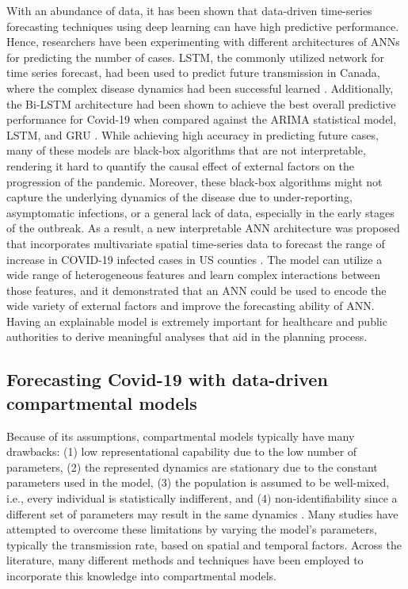 With an abundance of data, it has been shown that data-driven time-series forecasting techniques using deep learning can have high predictive performance.
Hence, researchers have been experimenting with different architectures of \glspl{ANN} for predicting the number of cases.
\gls{LSTM}, the commonly utilized network for time series forecast, had been used to predict future transmission in Canada, where the complex disease dynamics had been successful learned \cite{chimmulaTimeSeriesForecasting2020}.
Additionally, the \gls{Bi-LSTM} architecture had been shown to achieve the best overall predictive performance for Covid-19 when compared against the \gls{ARIMA} statistical model, \gls{LSTM}, and \gls{GRU} \cite{shahidPredictionsCOVID19Deep2020}.
While achieving high accuracy in predicting future cases, many of these models are black-box algorithms that are not interpretable, rendering it hard to quantify the causal effect of external factors on the progression of the pandemic.
Moreover, these black-box algorithms might not capture the underlying dynamics of the disease due to under-reporting, asymptomatic infections, or a general lack of data, especially in the early stages of the outbreak.
As a result, a new interpretable \gls{ANN} architecture was proposed that incorporates multivariate spatial time-series data to forecast the range of increase in COVID-19 infected cases in \gls{US} counties \cite{ramchandaniDeepCOVIDNetInterpretableDeep2020}.
The model can utilize a wide range of heterogeneous features and learn complex interactions between those features, and it demonstrated that an \gls{ANN} could be used to encode the wide variety of external factors and improve the forecasting ability of \gls{ANN}.
Having an explainable model is extremely important for healthcare and public authorities to derive meaningful analyses that aid in the planning process.

\subsection{Forecasting Covid-19 with data-driven compartmental models}

Because of its assumptions, compartmental models typically have many drawbacks: (1) low representational capability due to the low number of parameters, (2) the represented dynamics are stationary due to the constant parameters used in the model, (3) the population is assumed to be well-mixed, i.e., every individual is statistically indifferent, and (4) non-identifiability since a different set of parameters may result in the same dynamics \cite{roosaAssessingParameterIdentifiability2019}.
Many studies have attempted to overcome these limitations by varying the model's parameters, typically the transmission rate, based on spatial and temporal factors.
Across the literature, many different methods and techniques have been employed to incorporate this knowledge into compartmental models.

